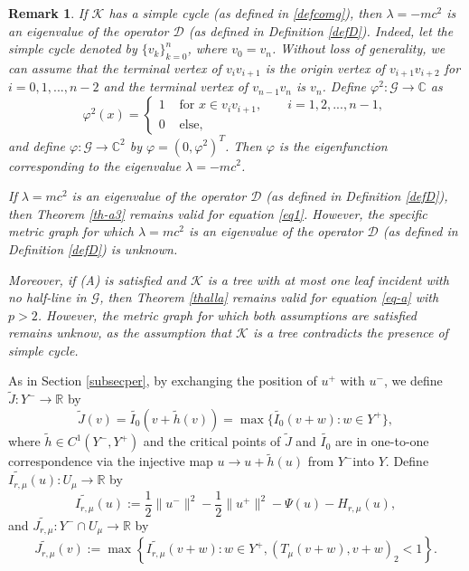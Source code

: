 \documentclass[11pt]{amsart}
\newtheorem{remark}[theorem]{Remark}
\newcommand{\norm}[1]{\lVert#1\rVert}
\newcommand{\D}{\mathcal{D}}
\newcommand{\G}{\mathcal{G}}
\newcommand{\K}{\mathcal{K}}
\numberwithin{equation}{section}
\begin{document}
\begin{remark}\label{remarknegative}
    If $\K$ has a simple cycle (as defined in \ref{defcomg}), then $\lambda = -mc^2$ is an eigenvalue of the operator $\D$ (as defined in Definition \ref{defD}). Indeed, let the simple cycle denoted by $\{v_k\}_{k=0}^n$, where $v_0=v_n$. Without loss of generality, we can assume that the terminal vertex of $v_iv_{i+1}$ is the origin vertex of $v_{i+1}v_{i+2}$ for $i=0,1,...,n-2$ and the terminal vertex of $v_{n-1}v_{n}$ is $v_n$. Define $\varphi^2: \G \to \mathbb{C}$ as
    $$
    \varphi^2(x)= \begin{cases}1 & \text { for } x \in v_iv_{i+1},\quad \quad i = 1,2,...,n-1,\\0 &\text { else},  \end{cases}
$$
and define $\varphi: \G \to \mathbb{C}^2$ by $\varphi = (0,\varphi^2)^T$. Then $\varphi$ is the eigenfunction corresponding to the eigenvalue $\lambda = -mc^2$.

If $\lambda = mc^2$ is an eigenvalue of the operator $\D$ (as defined in Definition \ref{defD}), then Theorem \ref{th-a3} remains valid for equation \eqref{eq1}. However, the specific metric graph for which $\lambda = mc^2$ is an eigenvalue of the operator $\D$ (as defined in Definition \ref{defD}) is unknown.

Moreover, if {\rm(A)} is satisfied and $\K$ is a tree with at most one leaf incident with no half-line in $\G$, then Theorem \ref{thalla} remains valid for equation \eqref{eq-a} with $p>2$. However, the metric graph for which both assumptions are  satisfied remains unknow, as the assumption that $\K$ is a tree contradicts the presence of simple cycle.
\end{remark}
As in Section \ref{subsecper}, by exchanging the position of $u^+$ with $u^-$, we define $\widetilde{J}: Y^{-} \rightarrow \mathbb{R}$ by
$$
\widetilde{J}(v)=\widetilde{I_0}(v+\widetilde{h}(v))=\max \{\widetilde{I_0}(v+w): w \in Y^{+}\},
$$
where $\widetilde{h} \in C^1\left(Y^{-}, Y^{+}\right)$ and the critical points of $\widetilde{J}$ and $\widetilde{I_0}$ are in one-to-one correspondence via the injective map $u \rightarrow u+\widetilde{h}(u)$ from $Y^{-}$into $Y$. Define  $\widetilde{I_{r, \mu}}(u):U_\mu \to \mathbb{R}$ by
$$
\widetilde{I_{r, \mu}}(u) := \frac{1}{2}\norm{u^{-}}^{2}-\frac{1}{2}\norm{u^{+}}^{2}-\Psi(u)-H_{r, \mu}(u),
$$ and
$\widetilde{J_{r, \mu}}: Y^- \cap U_\mu \to \mathbb{R}$ by
$$
\widetilde{J_{r, \mu}}(v):=\max \left\{\widetilde{I_{r, \mu}}(v+w): w \in Y^{+},(T_{\mu}(v+w), v+w)_{2}<1\right\}.
$$
\end{document}
